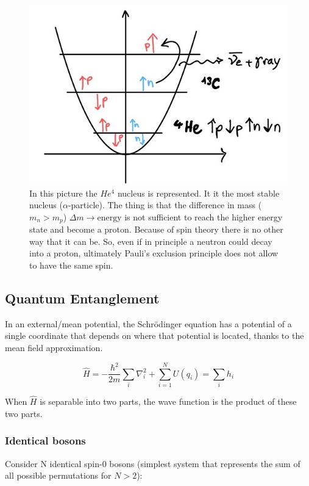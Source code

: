 		\begin{figure}[htbp!]
 			\centering
 			\includegraphics[scale=0.20]{img_7}
 			\caption{In this picture the $He^4$ nucleus is represented.
								It it the most stable nucleus ($\alpha$-particle).
								The thing is that the difference in mass ($m_n > m_p$) $\Delta m \rightarrow \text{energy}$ is not sufficient to reach the higher energy state and become a proton.
								Because of spin theory there is no other way that it can be.
								So, even if in principle a neutron could decay into a proton, ultimately Pauli's exclusion principle does not allow to have the same spin.}
 			\label{fig:decay}
		\end{figure}

	\subsection{Quantum Entanglement}
	In an external/mean potential, the Schr\"odinger equation has a potential of a single coordinate that depends on where that potential is located, thanks to the mean field approximation.

	$$\hat{H}=-\frac{\hbar^2}{2m}\sum_{i}\nabla_i^2+\sum_{i=1}^NU(q_i)=\sum_i h_i$$

	When $\hat{H}$ is separable into two parts, the wave function is the product of these two parts.


		\subsubsection{Identical bosons}
		Consider N identical spin-0 bosons (simplest system that represents the sum of all possible permutations for $N > 2$):

